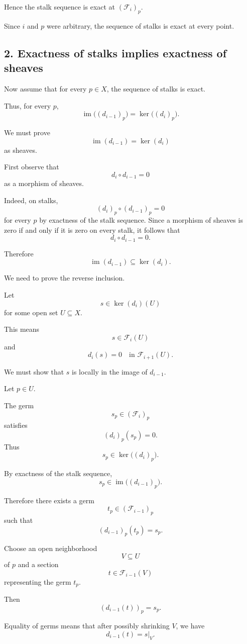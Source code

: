 Hence the stalk sequence is exact at $(\mathcal F_i)_p$.

Since $i$ and $p$ were arbitrary, the sequence of stalks is exact at every
point.

\subsection*{2. Exactness of stalks implies exactness of sheaves}

Now assume that for every $p \in X$, the sequence of stalks is exact.

Thus, for every $p$,
\[
\operatorname{im}\bigl((d_{i-1})_p\bigr)
=
\ker\bigl((d_i)_p\bigr).
\]

We must prove
\[
\operatorname{im}(d_{i-1})
=
\ker(d_i)
\]
as sheaves.

First observe that
\[
d_i \circ d_{i-1} = 0
\]
as a morphism of sheaves.

Indeed, on stalks,
\[
(d_i)_p \circ (d_{i-1})_p = 0
\]
for every $p$ by exactness of the stalk sequence. Since a morphism of sheaves
is zero if and only if it is zero on every stalk, it follows that
\[
d_i \circ d_{i-1} = 0.
\]

Therefore
\[
\operatorname{im}(d_{i-1})
\subseteq
\ker(d_i).
\]

We need to prove the reverse inclusion.

Let
\[
s \in \ker(d_i)(U)
\]
for some open set $U \subseteq X$.

This means
\[
s \in \mathcal F_i(U)
\]
and
\[
d_i(s)=0
\quad \text{in } \mathcal F_{i+1}(U).
\]

We must show that $s$ is locally in the image of $d_{i-1}$.

Let $p \in U$.

The germ
\[
s_p \in (\mathcal F_i)_p
\]
satisfies
\[
(d_i)_p(s_p)=0.
\]
Thus
\[
s_p \in \ker\bigl((d_i)_p\bigr).
\]

By exactness of the stalk sequence,
\[
s_p \in \operatorname{im}\bigl((d_{i-1})_p\bigr).
\]

Therefore there exists a germ
\[
t_p \in (\mathcal F_{i-1})_p
\]
such that
\[
(d_{i-1})_p(t_p)=s_p.
\]

Choose an open neighborhood
\[
V \subseteq U
\]
of $p$ and a section
\[
t \in \mathcal F_{i-1}(V)
\]
representing the germ $t_p$.

Then
\[
(d_{i-1}(t))_p = s_p.
\]

Equality of germs means that after possibly shrinking $V$, we have
\[
d_{i-1}(t) = s|_V.
\]

